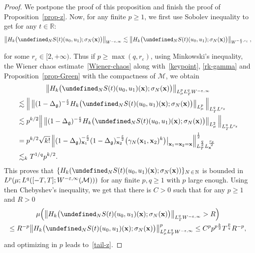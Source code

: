 \documentclass[AHL,Unicode,longabstracts,published]{cedram}
\newcommand{\R}{\mathbb{R}}
\newcommand{\N}{\mathbb{N}}
\let\P= \undefined
\newcommand{\P}{\mathbf{P}}
\newcommand{\x}{\mathbf{x}}
\newcommand{\M}{\mathcal{M}}
\newcommand{\g}{\mathfrak{g}}
\newcommand{\Dlg}{\Delta_{\g}}
\newcommand{\eps}{\varepsilon}
\newcommand{\s}{\sigma}
\newcommand{\les}{\lesssim}
\begin{document}
\begin{proof}
We postpone the proof of this proposition and finish the proof of Proposition~\ref{prop-z}. Now, for any finite $p\geq 1$, we first use Sobolev inequality to get for any $t\in\R$:
\begin{equation*}
\left\|H_k\big(\P_NS(t)(u_0,u_1);\s_N(\x)\big)\right\|_{W^{-\eps,\infty} }\les \left\|H_k\big(\P_NS(t)(u_0,u_1);\s_N(\x)\big)\right\|_{W^{-\frac{\eps}{2},r_{\eps}} },
\end{equation*}
\pagebreak

\noindent for some $r_{\eps}\in [2,+\infty)$. Thus if $p\geq \max(q, r_{\eps})$, using Minkowski's inequality, the Wiener chaos estimate~\eqref{Wiener-chaos} along with~\eqref{keypoint}, \eqref{rk-gamma} and Proposition~\ref{prop-Green} with the compactness of $\M$, we obtain
\begin{multline*}
\big\|H_k\big(\P_NS(t)(u_0,u_1)(\x);\s_N(\x)\big)\big\|_{ L^p_{\mu}L^{q}_TW^{-\eps,\infty} }\\
\begin{aligned}
&\les \Big\|\left\|(1-\Dlg)^{-\frac\eps2}H_k\big(\P_NS(t)(u_0,u_1)(\x);\s_N(\x)\big)\right\|_{L^p_\mu}\Big\|_{L^q_TL^{r_{\eps}} }\\
& \les p^{k/2} \Big\|\left\|(1-\Dlg)^{-\frac\eps2}H_k\big(\P_NS(t)(u_0,u_1)(\x);\s_N(\x)\big)\right\|_{L^2_\mu}\Big\|_{L^q_TL^{r_{\eps}}}\\
&= p^{k/2} \sqrt{k!}\left\|(1-\Dlg)_{\x_1}^{-\frac\eps2}(1-\Dlg)_{\x_2}^{-\frac{\eps}2}\big(\gamma_N(\x_1,\x_2)^k\big)\big|_{\x_1=\x_2=\x}\right\|_{L^{\frac{q}2}_TL^{\frac{r_{\eps}}2}_\x}^\frac12\\
&\les_k T^{1/q}p^{k/2}.
\end{aligned}
\end{multline*}
This proves that $\{H_k(\P_NS(t)(u_0,u_1)(\x);\s_N(\x))\}_{N\,\in\,\N}$ is bounded in $L^p(\mu;L^q([-T,T];\linebreak W^{-\eps,\infty}(\M)))$ for any finite $p,q\geq 1$ with $p$ large enough. Using then Chebyshev's inequality, we get that there is $C>0$ such that for any $p\geq 1$ and $R>0$
\begin{multline*}
\mu\Big(\big\|H_k\big(\P_NS(t)(u_0,u_1)(\x);\s_N(\x)\big)\big\|_{L^q_TW^{-\eps,\infty}}>R\Big) \\
\leq R^{-p}\big\|H_k\big(\P_NS(t)(u_0,u_1)(\x);\s_N(\x)\big)\big\|_{L^p_{\mu} L^q_TW^{-\eps,\infty} }^p\le C^p p^{p\frac{k}2}T^{\frac{p}q}R^{-p},
\end{multline*}
and optimizing in $p$ leads to~\eqref{tail-z}.


\end{proof}
\end{document}
